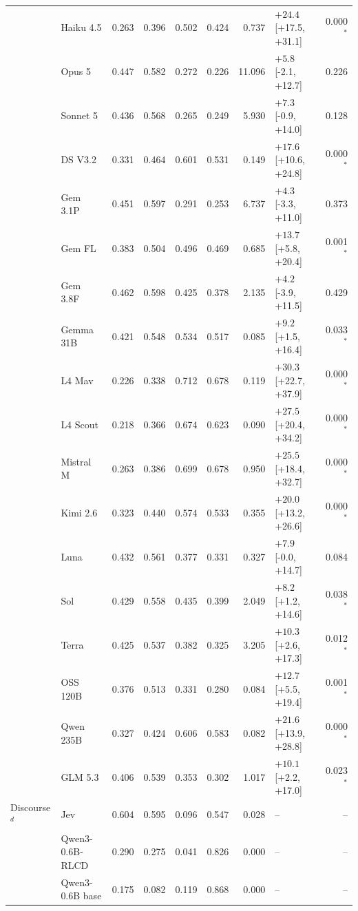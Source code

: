 \begin{longtable}{llrrrrrlr}
 & Haiku 4.5 & 0.263 & 0.396 & 0.502 & 0.424 & 0.737 & $+24.4$ [+17.5, +31.1] & 0.000$^{*}$ \\
 & Opus 5 & 0.447 & 0.582 & 0.272 & 0.226 & 11.096 & $+5.8$ [-2.1, +12.7] & 0.226 \\
 & Sonnet 5 & 0.436 & 0.568 & 0.265 & 0.249 & 5.930 & $+7.3$ [-0.9, +14.0] & 0.128 \\
 & DS V3.2 & 0.331 & 0.464 & 0.601 & 0.531 & 0.149 & $+17.6$ [+10.6, +24.8] & 0.000$^{*}$ \\
 & Gem 3.1P & 0.451 & 0.597 & 0.291 & 0.253 & 6.737 & $+4.3$ [-3.3, +11.0] & 0.373 \\
 & Gem FL & 0.383 & 0.504 & 0.496 & 0.469 & 0.685 & $+13.7$ [+5.8, +20.4] & 0.001$^{*}$ \\
 & Gem 3.8F & 0.462 & 0.598 & 0.425 & 0.378 & 2.135 & $+4.2$ [-3.9, +11.5] & 0.429 \\
 & Gemma 31B & 0.421 & 0.548 & 0.534 & 0.517 & 0.085 & $+9.2$ [+1.5, +16.4] & 0.033$^{*}$ \\
 & L4 Mav & 0.226 & 0.338 & 0.712 & 0.678 & 0.119 & $+30.3$ [+22.7, +37.9] & 0.000$^{*}$ \\
 & L4 Scout & 0.218 & 0.366 & 0.674 & 0.623 & 0.090 & $+27.5$ [+20.4, +34.2] & 0.000$^{*}$ \\
 & Mistral M & 0.263 & 0.386 & 0.699 & 0.678 & 0.950 & $+25.5$ [+18.4, +32.7] & 0.000$^{*}$ \\
 & Kimi 2.6 & 0.323 & 0.440 & 0.574 & 0.533 & 0.355 & $+20.0$ [+13.2, +26.6] & 0.000$^{*}$ \\
 & Luna & 0.432 & 0.561 & 0.377 & 0.331 & 0.327 & $+7.9$ [-0.0, +14.7] & 0.084 \\
 & Sol & 0.429 & 0.558 & 0.435 & 0.399 & 2.049 & $+8.2$ [+1.2, +14.6] & 0.038$^{*}$ \\
 & Terra & 0.425 & 0.537 & 0.382 & 0.325 & 3.205 & $+10.3$ [+2.6, +17.3] & 0.012$^{*}$ \\
 & OSS 120B & 0.376 & 0.513 & 0.331 & 0.280 & 0.084 & $+12.7$ [+5.5, +19.4] & 0.001$^{*}$ \\
 & Qwen 235B & 0.327 & 0.424 & 0.606 & 0.583 & 0.082 & $+21.6$ [+13.9, +28.8] & 0.000$^{*}$ \\
 & GLM 5.3 & 0.406 & 0.539 & 0.353 & 0.302 & 1.017 & $+10.1$ [+2.2, +17.0] & 0.023$^{*}$ \\
\midrule
Discourse$^{d}$ & Jev & 0.604 & 0.595 & 0.096 & 0.547 & 0.028 & -- & -- \\
 & Qwen3-0.6B-RLCD & 0.290 & 0.275 & 0.041 & 0.826 & 0.000 & -- & -- \\
 & Qwen3-0.6B base & 0.175 & 0.082 & 0.119 & 0.868 & 0.000 & -- & -- \\

\end{longtable}

